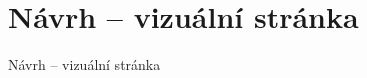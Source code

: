 \documentclass[10pt]{beamer}
\begin{document}
	\begin{frame}[plain]
	\end{frame}
	
	\begin{frame}[plain]
	\end{frame}
	
	\section{Návrh – vizuální stránka}
	\begin{frame}{Návrh – vizuální stránka}
	\end{frame}
	
\end{document}
